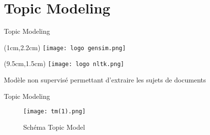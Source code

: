 \documentclass[10pt,sans,usenames,dvipsnames,english,compress]{beamer}
\begin{document}
\section{Topic Modeling}
\begin{frame}{Topic Modeling}
	\begin{textblock*}{3cm}(1cm,2.2cm)
		\texttt{[image: logo gensim.png]}
	\end{textblock*}

	\begin{textblock*}{3cm}(9.5cm,1.5cm)
		\texttt{[image: logo nltk.png]}
	\end{textblock*}

	\vspace{1cm}

	\begin{block}{}
		Modèle non supervisé permettant d'extraire les sujets de documents
	\end{block}

        \vspace{0.5cm}

\end{frame}

\begin{frame}{Topic Modeling}
\begin{figure}[!h]
    \centering
    \texttt{[image: tm(1).png]}
    \caption{Schéma Topic Model}
\end{figure}
\end{frame}
\end{document}
